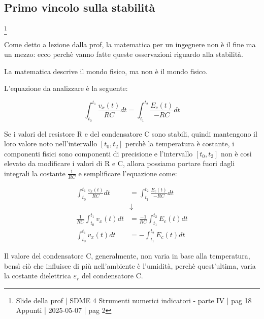 \subsection{Primo vincolo sulla stabilità}
\footnote{Slide della prof | SDME 4 Strumenti numerici indicatori - parte IV | pag 18\\  
Appunti | 2025-05-07 | pag 2}

\begin{tcolorbox}
    Come detto a lezione dalla prof, la matematica per un ingegnere non è il fine ma un mezzo: ecco perchè vanno fatte queste osservazioni riguardo alla stabilità. \newline

    La matematica descrive il mondo fisico, ma non è il mondo fisico. \newline 
\end{tcolorbox}

L'equazione da analizzare è la seguente: 

{
    \Large 
    \begin{equation}
        \int_{t_0}^{t_1} \frac{v_x(t)}{RC} dt 
        =
        \int_{t_1}^{t_2} \frac{E_c (t)}{-RC} dt
    \end{equation}
}

Se i valori del resistore R e del condensatore C sono stabili, quindi mantengono il loro valore noto nell'intervallo $[t_0, t_2]$ 
perchè la temperatura è costante, i componenti fisici sono componenti di precisione e l'intervallo $[t_0, t_2]$ non è così elevato da modificare i valori di R e C, 
allora possiamo portare fuori dagli integrali la costante $\frac{1}{RC}$ e semplificare l'equazione come: 

{
    \Large 
    \begin{equation}
        \begin{split}
        \int_{t_0}^{t_1} \frac{v_x(t)}{RC} dt 
        &=
        \int_{t_1}^{t_2} \frac{E_c (t)}{-RC} dt
        \\
        &\downarrow
        \\
        \frac{1}{RC}
        \int_{t_0}^{t_1} v_x(t) dt 
        &=
        \frac{-1}{RC}
        \int_{t_1}^{t_2} E_c (t) dt
        \\
        \int_{t_0}^{t_1} v_x(t) dt 
        &=
        -
        \int_{t_1}^{t_2} E_c (t) dt
    \end{split}
    \end{equation}
}

Il valore del condensatore C, generalmente, non varia in base alla temperatura, bensì ciò che influisce di più nell'ambiente è l'umidità, 
perchè quest'ultima, varia la costante dielettrica $\varepsilon_r$ del condensatore C. \newline 

